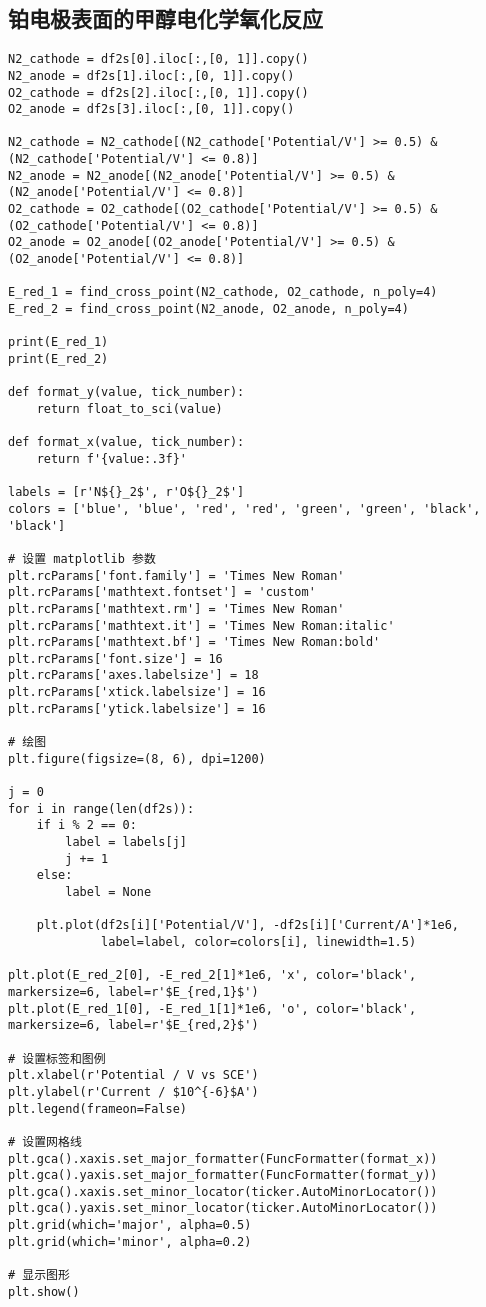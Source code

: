 \subsection{铂电极表面的甲醇电化学氧化反应}

\begin{verbatim}
N2_cathode = df2s[0].iloc[:,[0, 1]].copy()
N2_anode = df2s[1].iloc[:,[0, 1]].copy()
O2_cathode = df2s[2].iloc[:,[0, 1]].copy()
O2_anode = df2s[3].iloc[:,[0, 1]].copy()

N2_cathode = N2_cathode[(N2_cathode['Potential/V'] >= 0.5) & (N2_cathode['Potential/V'] <= 0.8)]
N2_anode = N2_anode[(N2_anode['Potential/V'] >= 0.5) & (N2_anode['Potential/V'] <= 0.8)]
O2_cathode = O2_cathode[(O2_cathode['Potential/V'] >= 0.5) & (O2_cathode['Potential/V'] <= 0.8)]
O2_anode = O2_anode[(O2_anode['Potential/V'] >= 0.5) & (O2_anode['Potential/V'] <= 0.8)]

E_red_1 = find_cross_point(N2_cathode, O2_cathode, n_poly=4)
E_red_2 = find_cross_point(N2_anode, O2_anode, n_poly=4)

print(E_red_1)
print(E_red_2)

def format_y(value, tick_number):
    return float_to_sci(value)

def format_x(value, tick_number):
    return f'{value:.3f}'

labels = [r'N${}_2$', r'O${}_2$']
colors = ['blue', 'blue', 'red', 'red', 'green', 'green', 'black', 'black']

# 设置 matplotlib 参数
plt.rcParams['font.family'] = 'Times New Roman'
plt.rcParams['mathtext.fontset'] = 'custom'
plt.rcParams['mathtext.rm'] = 'Times New Roman'
plt.rcParams['mathtext.it'] = 'Times New Roman:italic'
plt.rcParams['mathtext.bf'] = 'Times New Roman:bold'
plt.rcParams['font.size'] = 16
plt.rcParams['axes.labelsize'] = 18
plt.rcParams['xtick.labelsize'] = 16
plt.rcParams['ytick.labelsize'] = 16

# 绘图
plt.figure(figsize=(8, 6), dpi=1200)

j = 0
for i in range(len(df2s)):
    if i % 2 == 0:
        label = labels[j]
        j += 1
    else:
        label = None

    plt.plot(df2s[i]['Potential/V'], -df2s[i]['Current/A']*1e6, 
             label=label, color=colors[i], linewidth=1.5)

plt.plot(E_red_2[0], -E_red_2[1]*1e6, 'x', color='black', markersize=6, label=r'$E_{red,1}$')
plt.plot(E_red_1[0], -E_red_1[1]*1e6, 'o', color='black', markersize=6, label=r'$E_{red,2}$')

# 设置标签和图例
plt.xlabel(r'Potential / V vs SCE')
plt.ylabel(r'Current / $10^{-6}$A')
plt.legend(frameon=False)

# 设置网格线
plt.gca().xaxis.set_major_formatter(FuncFormatter(format_x))
plt.gca().yaxis.set_major_formatter(FuncFormatter(format_y))
plt.gca().xaxis.set_minor_locator(ticker.AutoMinorLocator())
plt.gca().yaxis.set_minor_locator(ticker.AutoMinorLocator())
plt.grid(which='major', alpha=0.5)
plt.grid(which='minor', alpha=0.2)

# 显示图形
plt.show()
\end{verbatim}

